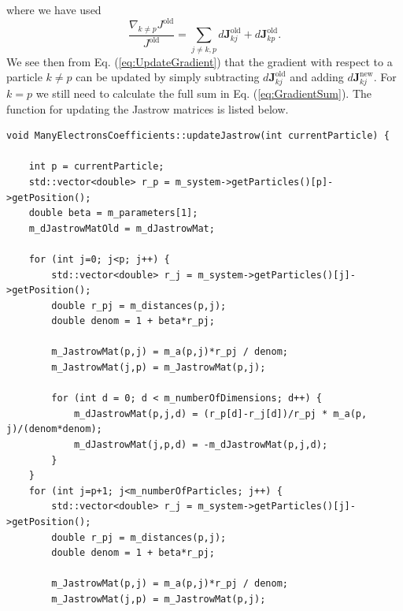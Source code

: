 \documentclass[../main.tex]{subfiles}
\begin{document}
where we have used 
\begin{equation}
    \frac{\nabla_{k\neq p} J^\textrm{old}}{J^\textrm{old}} = \sum_{j\neq k,p} d\mathbf{J}_{kj}^\textrm{old} + d\mathbf{J}_{kp}^\textrm{old}.
\end{equation}
We see then from Eq. (\ref{eq:UpdateGradient}) that the gradient with respect to a particle $k\neq p$ can be updated by simply subtracting $d\mathbf{J}_{kj}^\textrm{old}$ and adding $d\mathbf{J}_{kj}^\textrm{new}$. For $k=p$ we still need to calculate the full sum in Eq. (\ref{eq:GradientSum}). The function for updating the Jastrow matrices is listed below.

\lstset{language=c++}
\begin{lstlisting}[caption={Function for updating the Jastrow related matrices whenever a particle is moved. $p$ is the moved particle so only the matrix elements where one of the indices is $p$ are changed in "m\_JastrowMat" and "m\_dJastrowMat" when particle $p$ moves. In "m\_JastrowGrad" all elements need to be changed, however for $i\neq p$ the updating is simple and efficient. Since no particle has any distance to itself, we split the loop in two so that we can exclude the $j=p$ case without using an if-test. "m\_JastrowMat" is symmetric and "m\_dJastrowMat" is antisymmetric so for these we can halve the number of calculations.}]
void ManyElectronsCoefficients::updateJastrow(int currentParticle) {

    int p = currentParticle;
    std::vector<double> r_p = m_system->getParticles()[p]->getPosition();
    double beta = m_parameters[1];
    m_dJastrowMatOld = m_dJastrowMat;

    for (int j=0; j<p; j++) {
        std::vector<double> r_j = m_system->getParticles()[j]->getPosition();
        double r_pj = m_distances(p,j);
        double denom = 1 + beta*r_pj;

        m_JastrowMat(p,j) = m_a(p,j)*r_pj / denom;
        m_JastrowMat(j,p) = m_JastrowMat(p,j);

        for (int d = 0; d < m_numberOfDimensions; d++) {
            m_dJastrowMat(p,j,d) = (r_p[d]-r_j[d])/r_pj * m_a(p, j)/(denom*denom);
            m_dJastrowMat(j,p,d) = -m_dJastrowMat(p,j,d);
        }
    }
    for (int j=p+1; j<m_numberOfParticles; j++) {
        std::vector<double> r_j = m_system->getParticles()[j]->getPosition();
        double r_pj = m_distances(p,j);
        double denom = 1 + beta*r_pj;

        m_JastrowMat(p,j) = m_a(p,j)*r_pj / denom;
        m_JastrowMat(j,p) = m_JastrowMat(p,j);


\end{lstlisting}
\end{document}
